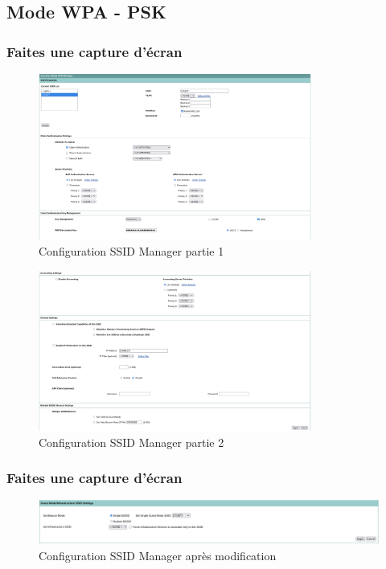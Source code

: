 \documentclass[12pt, a4paper]{article}
\begin{document}
    \subsection{Mode WPA - PSK}

        \subsubsection{Faites une capture d'écran}
        \begin{figure}[H]
            \centering
            \includegraphics[width=0.8\textwidth]{img/ssid-manage1.png}
            \caption{Configuration SSID Manager partie 1}
            \label{fig:ssid1}
        \end{figure}
        \begin{figure}[H]
            \centering
            \includegraphics[width=0.8\textwidth]{img/ssid-manage2.png}
            \caption{Configuration SSID Manager partie 2}
            \label{fig:ssid2}
        \end{figure}

        \subsubsection{Faites une capture d'écran}
        \begin{figure}[H]
            \centering
            \includegraphics[width=1\textwidth]{img/config-manage3.png}
            \caption{Configuration SSID Manager après modification}
            \label{fig:ssid3}
        \end{figure}
\end{document}
